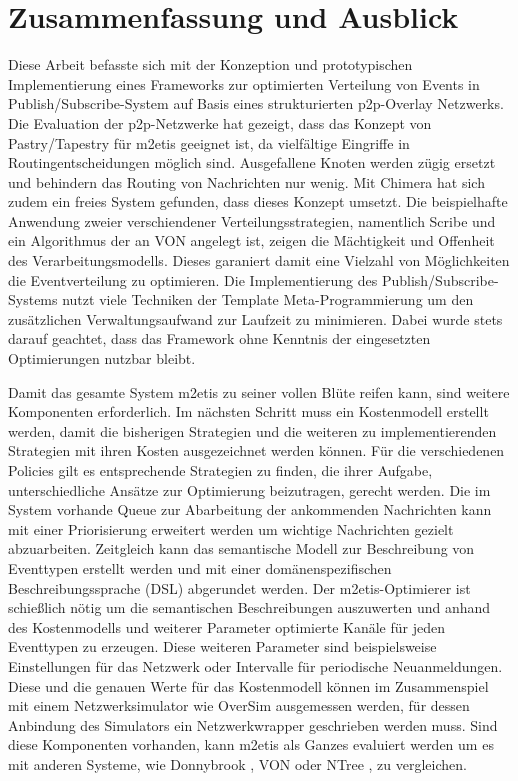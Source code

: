 \chapter{Zusammenfassung und Ausblick} 
\label{chap:zus}
Diese Arbeit befasste sich mit der Konzeption und prototypischen Implementierung eines Frameworks zur optimierten Verteilung von Events in Publish/Subscribe-System auf Basis eines strukturierten p2p-Overlay Netzwerks.\\
Die Evaluation der p2p-Netzwerke hat gezeigt, dass das Konzept von Pastry/Tapestry für \ac{m2etis} geeignet ist, da vielfältige Eingriffe in Routingentscheidungen möglich sind. Ausgefallene Knoten werden zügig ersetzt und behindern das Routing von Nachrichten nur wenig. Mit  Chimera hat sich zudem ein freies System gefunden, dass dieses Konzept umsetzt. Die beispielhafte Anwendung zweier verschiendener Verteilungsstrategien, namentlich Scribe und ein Algorithmus der an VON angelegt ist, zeigen die Mächtigkeit und Offenheit des Verarbeitungsmodells. Dieses garaniert damit eine Vielzahl von Möglichkeiten die Eventverteilung zu optimieren. Die Implementierung des Publish/Subscribe-Systems nutzt viele Techniken der Template Meta-Programmierung um den zusätzlichen Verwaltungsaufwand zur Laufzeit zu minimieren. Dabei wurde stets darauf geachtet, dass das Framework ohne Kenntnis der eingesetzten Optimierungen nutzbar bleibt.

Damit das gesamte System \ac{m2etis} zu seiner vollen Blüte reifen kann, sind weitere Komponenten erforderlich. Im nächsten Schritt muss ein Kostenmodell erstellt werden, damit die bisherigen Strategien und die weiteren zu implementierenden Strategien mit ihren Kosten ausgezeichnet werden können. Für die verschiedenen Policies gilt es entsprechende Strategien zu finden, die ihrer Aufgabe, unterschiedliche Ansätze zur Optimierung beizutragen, gerecht werden. Die im System vorhande Queue zur Abarbeitung der ankommenden Nachrichten kann mit einer Priorisierung erweitert werden um wichtige Nachrichten gezielt abzuarbeiten. Zeitgleich kann das semantische Modell zur Beschreibung von Eventtypen erstellt werden und mit einer domänenspezifischen Beschreibungssprache (DSL) abgerundet werden. Der \ac{m2etis}-Optimierer ist schießlich nötig um die semantischen Beschreibungen auszuwerten und anhand des Kostenmodells und weiterer Parameter optimierte Kanäle für jeden Eventtypen zu erzeugen. Diese weiteren Parameter sind beispielsweise Einstellungen für das Netzwerk oder Intervalle für periodische Neuanmeldungen. Diese und die genauen Werte für das Kostenmodell können im Zusammenspiel mit einem Netzwerksimulator wie OverSim \cite{Baumgart2007OverSim} ausgemessen werden, für dessen Anbindung des Simulators ein Netzwerkwrapper geschrieben werden muss. Sind diese Komponenten vorhanden, kann \ac{m2etis} als Ganzes evaluiert werden um es mit anderen Systeme, wie Donnybrook \cite{Bharambe2008Donnybrook}, VON \cite{Hu2006VON} oder NTree \cite{GauthierDickey2005Using}, zu vergleichen.
